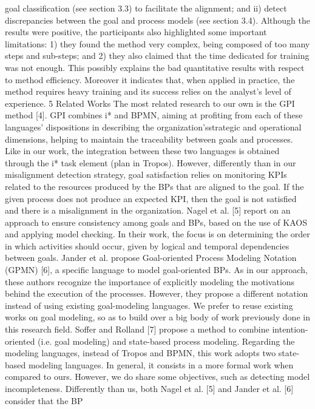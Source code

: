 goal classification (see section 3.3) to facilitate the alignment; and ii) detect discrepancies between the goal and process models (see section 3.4).
Although the results were positive, the participants also highlighted some important
limitations: 1) they found the method very complex, being composed of too many steps
and sub-steps; and 2) they also claimed that the time dedicated for training was not
enough. This possibly explains the bad quantitative results with respect to method efficiency. Moreover it indicates that, when applied in practice, the method requires heavy
training and its success relies on the analyst’s level of experience.
5 Related Works
The most related research to our own is the GPI method [4]. GPI combines i* and
BPMN, aiming at profiting from each of these languages’ dispositions in describing the
organization’sstrategic and operational dimensions, helping to maintain the traceability
between goals and processes. Like in our work, the integration between these two languages is obtained through the i* task element (plan in Tropos). However, differently
than in our misalignment detection strategy, goal satisfaction relies on monitoring KPIs
related to the resources produced by the BPs that are aligned to the goal. If the given
process does not produce an expected KPI, then the goal is not satisfied and there is a
misalignment in the organization.
Nagel et al. [5] report on an approach to ensure consistency among goals and BPs,
based on the use of KAOS and applying model checking. In their work, the focus is on
determining the order in which activities should occur, given by logical and temporal
dependencies between goals.
Jander et al. propose Goal-oriented Process Modeling Notation (GPMN) [6], a specific language to model goal-oriented BPs. As in our approach, these authors recognize
the importance of explicitly modeling the motivations behind the execution of the processes. However, they propose a different notation instead of using existing goal-modeling languages. We prefer to reuse existing works on goal modeling, so as to build
over a big body of work previously done in this research field.
Soffer and Rolland [7] propose a method to combine intention-oriented (i.e. goal
modeling) and state-based process modeling. Regarding the modeling languages, instead of Tropos and BPMN, this work adopts two state-based modeling languages. In
general, it consists in a more formal work when compared to ours. However, we do
share some objectives, such as detecting model incompleteness.
Differently than us, both Nagel et al. [5] and Jander et al. [6] consider that the BP
